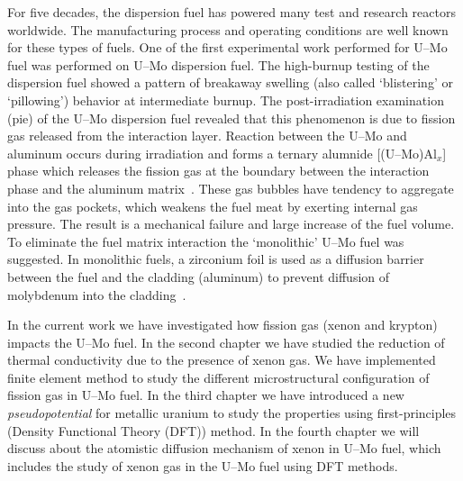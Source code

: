 For five decades, the dispersion fuel has powered many test and research reactors worldwide. The manufacturing process and operating conditions are well known for these types of fuels. One of the first experimental work performed for U--Mo fuel was performed on U--Mo dispersion fuel. The high-burnup testing of the dispersion fuel showed a pattern of breakaway swelling (also called `blistering' or `pillowing') behavior at intermediate burnup. The post-irradiation examination (pie) of the U--Mo dispersion fuel revealed that this phenomenon is due to fission gas released from the interaction layer. Reaction between the U--Mo and aluminum occurs during irradiation and forms a ternary alumnide [(U--Mo)Al$_x$] phase which releases the fission gas at the boundary between the interaction phase and the aluminum matrix~\cite{leenaers2004post,jue2014microstructural,van2008transmission, olander2009growth}. These gas bubbles have tendency to aggregate into the gas pockets, which weakens the fuel meat by exerting internal gas pressure. The result is a mechanical failure and large increase of the fuel volume. To eliminate the fuel matrix interaction the `monolithic' U--Mo fuel was suggested. In monolithic fuels, a zirconium foil is used as a diffusion barrier between the fuel and the cladding (aluminum) to prevent diffusion of molybdenum into the cladding~\cite{jue2014microstructural}.


In the current work we have investigated how fission gas (xenon and krypton) impacts the U--Mo fuel. In the second chapter we have studied the reduction of thermal conductivity due to the presence of xenon gas. We have implemented finite element method to study the different microstructural configuration of fission gas in U--Mo fuel. In the third chapter we have introduced a new \textit{pseudopotential} for metallic uranium to study the properties using first-principles (Density Functional Theory (DFT)) method. In the fourth chapter we will discuss about the atomistic diffusion mechanism of xenon in U--Mo fuel, which includes the study of xenon gas in the U--Mo fuel using DFT methods. 


















